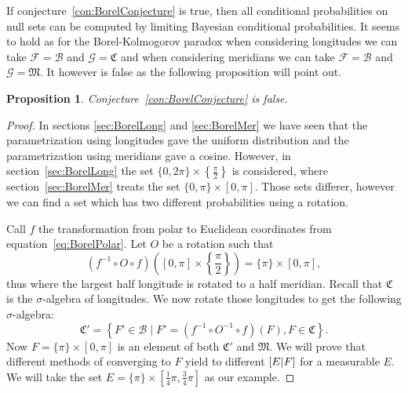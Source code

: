 \documentclass[twoside,a4paper]{report}
\theoremstyle{plain}
\newtheorem{proposition}[theorem]{Proposition}
\theoremstyle{definition}
\theoremstyle{remark}
\numberwithin{equation}{chapter}
\let\P\relax
\DeclareMathOperator{\P}{\mathbb{P}}
\DeclareMathOperator{\1}{\mathbbm{1}}
\newcommand{\F}{\mathcal{F}}
\renewcommand{\G}{\mathcal{G}}
\newcommand{\B}{\mathcal{B}}
\begin{document}
If conjecture~\ref{con:BorelConjecture} is true, then all conditional probabilities on null sets can be computed by limiting Bayesian conditional probabilities. It seems to hold as for the Borel-Kolmogorov paradox when considering longitudes we can take $\F=\B$ and $\G=\mathfrak{C}$ and when considering meridians we can take $\F=\B$ and $\G=\mathfrak{M}$. It however is false as the following proposition will point out.

\begin{proposition}\label{prop:BorelConFalse}
Conjecture~\ref{con:BorelConjecture} is false.
\end{proposition}
\begin{proof}
In sections \ref{sec:BorelLong} and \ref{sec:BorelMer} we have seen that the parametrization using longitudes gave the uniform distribution and the parametrization using meridians gave a cosine. However, in section~\ref{sec:BorelLong} the set $\{0,2\pi\}\times\left\{\frac{\pi}{2}\right\}$ is considered, where section~\ref{sec:BorelMer} treats the set $\{0,\pi\}\times[0,\pi]$. Those sets differer, however we can find a set which has two different probabilities using a rotation.

Call $f$ the transformation from polar to Euclidean coordinates from equation~\ref{eq:BorelPolar}. Let $O$ be a rotation such that
\begin{equation}
(f^{-1}\circ O\circ f)\left([0,\pi]\times\left\{\frac{\pi}{2}\right\}\right)=\{\pi\}\times[0,\pi],
\end{equation}
thus where the largest half longitude is rotated to a half meridian. Recall that $\mathfrak{C}$ is the $\sigma$-algebra of longitudes. We now rotate those longitudes to get the following $\sigma$-algebra:
\begin{equation}
\mathfrak{C}'=\left\{F'\in\B\mid F'=\left(f^{-1}\circ O^{-1}\circ f\right)(F),F\in\mathfrak{C}\right\}.
\end{equation}
Now $F=\{\pi\}\times[0,\pi]$ is an element of both $\mathfrak{C}'$ and $\mathfrak{M}$. We will prove that different methods of converging to $F$ yield to different $\P[E|F]$ for a measurable $E$. We will take the set $E=\{\pi\}\times\left[\frac{1}{4}\pi,\frac{3}{4}\pi\right]$ as our example.


\end{proof}
\end{document}
